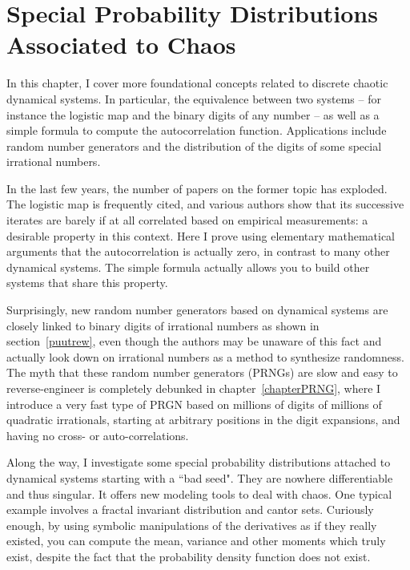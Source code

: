 \documentclass[oneside,10pt]{book}
\begin{document}

\chapter{Special Probability Distributions Associated to Chaos}

In this chapter, I cover more foundational concepts related to discrete chaotic dynamical systems. In particular, the equivalence between two systems -- for instance the logistic map and the binary digits of any number  -- as well as a simple formula to compute the autocorrelation function. Applications include random number generators and the
 distribution of the digits of some special irrational numbers.

In the last few years, the number of papers on the former topic
 has exploded. The logistic map is frequently cited, and various authors show that its successive iterates are barely if at all correlated based on
 empirical measurements: a desirable property in this context. Here I prove using elementary mathematical arguments that the
autocorrelation is actually zero, in contrast to many other dynamical systems. The simple formula actually  allows you to build other systems
 that share this property.

Surprisingly, new random number generators based on dynamical systems are closely linked to binary
 digits of irrational numbers as shown in section~\ref{puutrew}, even though the authors may be unaware of this fact and actually look down on irrational numbers
 as a method to
 synthesize randomness. The myth that these random number generators (PRNGs) are slow and easy to reverse-engineer is completely
 debunked in chapter~\ref{chapterPRNG}, where I introduce a very fast type of PRGN based on millions of digits of millions of
 quadratic irrationals, starting at arbitrary positions in the digit expansions, and having no cross- or auto-correlations.

Along the way, I investigate some special probability distributions attached to dynamical systems starting with a ``bad seed". They
 are  nowhere differentiable and thus singular. It offers new modeling tools to deal
 with chaos. One typical example involves a fractal invariant distribution and cantor sets.
Curiously enough, by using symbolic manipulations of the derivatives as if they really existed, you can compute the mean, variance and other moments which truly exist, despite the fact that the probability density function does not exist.
\end{document}
